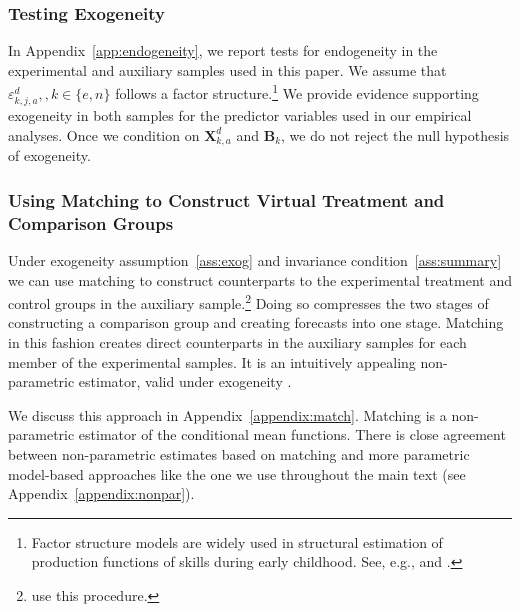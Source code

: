 \subsubsection{Testing Exogeneity}\label{section:accendog}

In  Appendix~\ref{app:endogeneity}, we report tests for endogeneity in the experimental and auxiliary samples used in this paper. We assume that $\varepsilon_{k,j,a}^d, , k \in \{e,n\}$ follows a factor structure.\footnote{Factor structure models are widely used in structural estimation of production functions of skills during early childhood. See, e.g., \cite{Cunha_Heckman_2008_JHR,Cunha_Heckman_etal_2010_est_tech_cognoncog} and \cite{Agostinelli_Wiswall_2016_EstimatingTech}.} We provide evidence supporting exogeneity in both samples for the predictor variables used in our empirical analyses. Once we condition on $\bm{X}_{k,a}^d$ and $\bm{B}_{k}$, we do not reject the null hypothesis of exogeneity.

\subsubsection{Using Matching to Construct Virtual Treatment and Comparison Groups}\label{usingmatching}

Under exogeneity assumption~\ref{ass:exog} and invariance condition~\ref{ass:summary} we can use matching to construct counterparts to the experimental treatment and control groups in the auxiliary sample.\footnote{\citet{Heckman_Ichimura_etal_1998_Econometrica} use this procedure.} Doing so compresses the two stages of constructing a comparison group and creating forecasts into one stage. Matching in this fashion creates direct counterparts in the auxiliary samples for each member of the experimental samples. It is an intuitively appealing non-parametric estimator, valid under exogeneity \citep{Heckman_Navarro_2004_REStat}.

We discuss this approach in Appendix~\ref{appendix:match}. Matching is a non-parametric estimator of the conditional mean functions. There is close agreement between non-parametric estimates based on matching and more parametric model-based approaches like the one we use throughout the main text (see  Appendix~\ref{appendix:nonpar}).

